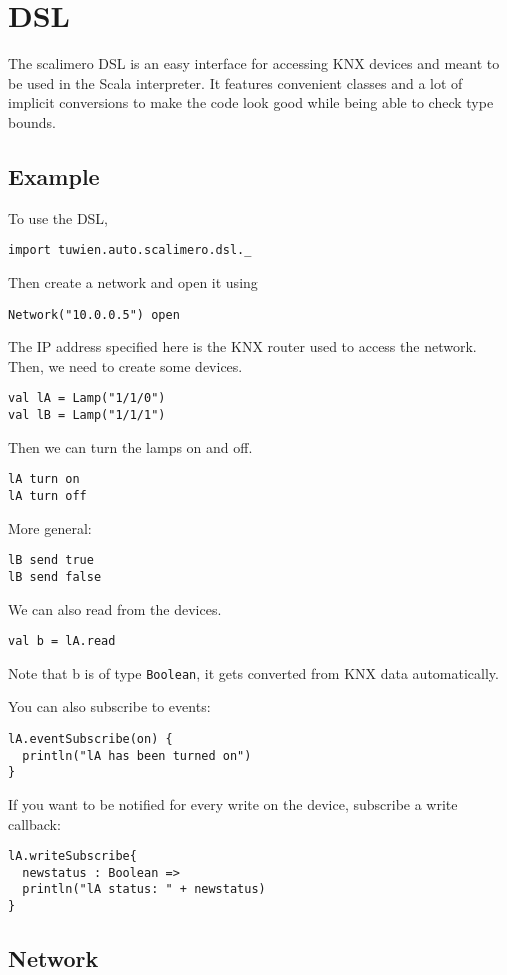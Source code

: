 \chapter{DSL}
The scalimero DSL is an easy interface for accessing KNX devices and meant to be used in the Scala interpreter. It features convenient classes and a lot of implicit conversions to make the code look good while being able to check type bounds.

\section{Example}
To use the DSL,
\begin{lstlisting}
import tuwien.auto.scalimero.dsl._
\end{lstlisting}
Then create a network and open it using
\begin{lstlisting}
Network("10.0.0.5") open
\end{lstlisting}
The IP address specified here is the KNX router used to access the network. Then, we need to create some devices.
\begin{lstlisting}
val lA = Lamp("1/1/0")
val lB = Lamp("1/1/1")
\end{lstlisting}
Then we can turn the lamps on and off.
\begin{lstlisting}
lA turn on
lA turn off
\end{lstlisting}
More general:
\begin{lstlisting}
lB send true
lB send false
\end{lstlisting}
We can also read from the devices.
\begin{lstlisting}
val b = lA.read
\end{lstlisting}
Note that b is of type \lstinline!Boolean!, it gets converted from KNX data automatically.

You can also subscribe to events:
\begin{lstlisting}
lA.eventSubscribe(on) {
  println("lA has been turned on")
}
\end{lstlisting}

If you want to be notified for every write on the device, subscribe a write callback:
\begin{lstlisting}
lA.writeSubscribe{
  newstatus : Boolean =>
  println("lA status: " + newstatus)
}
\end{lstlisting}

\section{Network}

